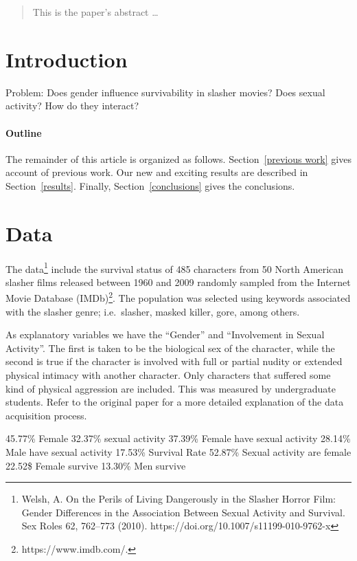 \documentclass[12pt]{article}
\begin{document}
\maketitle

\begin{abstract}
This is the paper's abstract \ldots
\end{abstract}

\section{Introduction}
Problem: Does gender influence survivability in slasher movies? Does sexual activity? How do they interact?

\paragraph{Outline}
The remainder of this article is organized as follows.
Section~\ref{previous work} gives account of previous work.
Our new and exciting results are described in Section~\ref{results}.
Finally, Section~\ref{conclusions} gives the conclusions.

\section{Data}\label{data}
The data\footnote{Welsh, A. On the Perils of Living Dangerously in the Slasher Horror Film: Gender Differences in the Association Between Sexual Activity and Survival. Sex Roles 62, 762–773 (2010). https://doi.org/10.1007/s11199-010-9762-x} include the survival status of 485 characters from 50 North American slasher films released between 1960 and 2009 randomly sampled from the Internet Movie Database (IMDb)\footnote{https://www.imdb.com/.}. The population was selected using keywords associated with the slasher genre; i.e.\ slasher, masked killer, gore, among others.

As explanatory variables we have the ``Gender'' and ``Involvement in Sexual Activity''. The first is taken to be the biological sex of the character, while the second is true if the character is involved with full or partial nudity or extended physical intimacy with another character. Only characters that suffered some kind of physical aggression are included. This was measured by undergraduate students. Refer to the original paper for a more detailed explanation of the data acquisition process.

45.77\% Female
32.37\% sexual activity
37.39\% Female have sexual activity
28.14\% Male have sexual activity
17.53\% Survival Rate
52.87\% Sexual activity are female
22.52\$ Female survive
13.30\% Men survive
\end{document}
